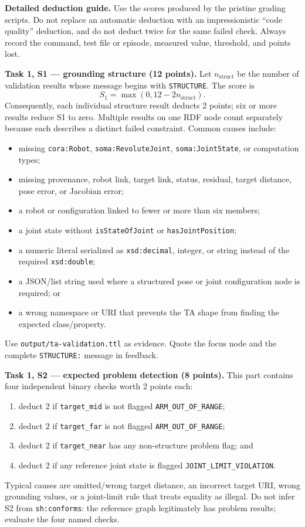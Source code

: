 \documentclass[11pt]{article}
\newcommand{\code}[1]{\nolinkurl{#1}}
\begin{document}
\begin{tutornote}
\textbf{Detailed deduction guide.} Use the scores produced by the pristine
grading scripts. Do not replace an automatic deduction with an impressionistic
``code quality'' deduction, and do not deduct twice for the same failed check.
Always record the command, test file or episode, measured value, threshold,
and points lost.

\medskip
\textbf{Task 1, S1 --- grounding structure (12 points).}
Let \(n_{\mathrm{struct}}\) be the number of validation results whose message
begins with \code{STRUCTURE}. The score is
\[
S_1=\max(0,12-2n_{\mathrm{struct}}).
\]
Consequently, each individual structure result deducts 2 points; six or more
results reduce S1 to zero. Multiple results on one RDF node count separately
because each describes a distinct failed constraint. Common causes include:
\begin{itemize}
  \item missing \code{cora:Robot}, \code{soma:RevoluteJoint},
    \code{soma:JointState}, or computation types;
  \item missing provenance, robot link, target link, status, residual, target
    distance, pose error, or Jacobian error;
  \item a robot or configuration linked to fewer or more than six members;
  \item a joint state without \code{isStateOfJoint} or
    \code{hasJointPosition};
  \item a numeric literal serialized as \code{xsd:decimal}, integer, or string
    instead of the required \code{xsd:double};
  \item a JSON/list string used where a structured pose or joint configuration
    node is required; or
  \item a wrong namespace or URI that prevents the TA shape from finding the
    expected class/property.
\end{itemize}
Use \code{output/ta-validation.ttl} as evidence. Quote the focus node and the
complete \code{STRUCTURE:} message in feedback.

\medskip
\textbf{Task 1, S2 --- expected problem detection (8 points).}
This part contains four independent binary checks worth 2 points each:
\begin{enumerate}
  \item deduct 2 if \code{target_mid} is not flagged
    \code{ARM_OUT_OF_RANGE};
  \item deduct 2 if \code{target_far} is not flagged
    \code{ARM_OUT_OF_RANGE};
  \item deduct 2 if \code{target_near} has any non-structure problem flag; and
  \item deduct 2 if any reference joint state is flagged
    \code{JOINT_LIMIT_VIOLATION}.
\end{enumerate}
Typical causes are omitted/wrong target distance, an incorrect target URI,
wrong grounding values, or a joint-limit rule that treats equality as illegal.
Do not infer S2 from \code{sh:conforms}: the reference graph legitimately has
problem results; evaluate the four named checks.


\end{tutornote}
\end{document}
